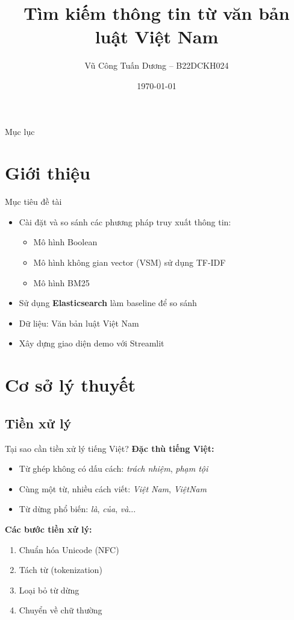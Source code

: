 \documentclass[serif, aspectratio=169]{beamer}
\author{Vũ Công Tuấn Dương -- B22DCKH024}
\title{Tìm kiếm thông tin từ văn bản luật Việt Nam}
\institute{Khoa CNTT1 -- PTIT}
\date{\small \today}
\begin{document}
\begin{frame}
    \titlepage
\end{frame}

\begin{frame}{Mục lục}
    \tableofcontents
\end{frame}

\section{Giới thiệu}
\begin{frame}{Mục tiêu đề tài}
\begin{itemize}
    \item Cài đặt và so sánh các phương pháp truy xuất thông tin:
    \begin{itemize}
        \item Mô hình Boolean
        \item Mô hình không gian vector (VSM) sử dụng TF-IDF
        \item Mô hình BM25
    \end{itemize}
    \item Sử dụng \textbf{Elasticsearch} làm baseline để so sánh
    \item Dữ liệu: Văn bản luật Việt Nam
    \item Xây dựng giao diện demo với Streamlit
\end{itemize}
\end{frame}

\section{Cơ sở lý thuyết}

\subsection{Tiền xử lý}
\begin{frame}{Tại sao cần tiền xử lý tiếng Việt?}
\textbf{Đặc thù tiếng Việt:}
\begin{itemize}
    \item Từ ghép không có dấu cách: \textit{trách nhiệm}, \textit{phạm tội}
    \item Cùng một từ, nhiều cách viết: \textit{Việt Nam}, \textit{ViệtNam}
    \item Từ dừng phổ biến: \textit{là}, \textit{của}, \textit{và}...
\end{itemize}

\vspace{0.3cm}
\textbf{Các bước tiền xử lý:}
\begin{enumerate}
    \item Chuẩn hóa Unicode (NFC)
    \item Tách từ (tokenization)
    \item Loại bỏ từ dừng
    \item Chuyển về chữ thường
\end{enumerate}
\end{frame}
\end{document}
